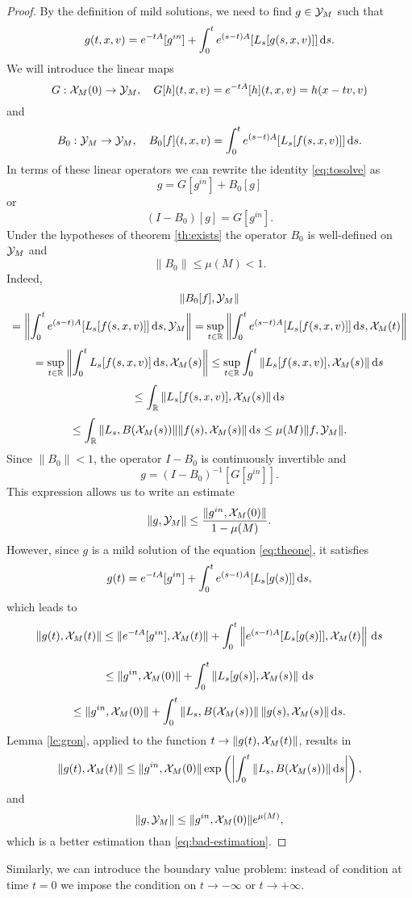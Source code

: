 \begin{proof}
	By the definition of mild solutions, we need to find $g\in {\mathcal Y_M}$ such that \begin{equation}\label{eq:tosolve}
		g(t,x,v) = e^{-tA}[g^{in}]+\int_0^te^{(s-t)A}[L_s[g(s,x,v)]]{\,\mathrm ds}.
	\end{equation}
We will introduce the linear maps \[G:{\mathcal X_M(0)}\to{\mathcal Y_M},\quad G[h](t,x,v)=e^{-tA}[h](t,x,v) = h(x-tv,v) \]and
\[B_0:{\mathcal Y_M}\to{\mathcal Y_M},\quad B_0[f](t,x,v) = \int_0^t e^{(s-t)A}[L_s[f(s,x,v)]]{\,\mathrm ds}.\]
In terms of these linear operators we can rewrite the identity \eqref{eq:tosolve} as 
\[g = G[g^{in}]+B_0[g]\] or \[(I-B_0)[g]=G[g^{in}].\]
	Under the hypotheses of   theorem \ref{th:exists} the operator $B_0$ is well-defined on ${\mathcal Y_M}$ and \[\|B_0\|\le \mu(M) <1.\]
	Indeed,
	\[\|B_0[f],{\mathcal Y_M}\|\]
	\[=\left\|\int_0^te^{(s-t)A}[L_s[f(s,x,v)]]{\,\mathrm ds} ,{\mathcal Y_M} \right\|=\sup_{t\in{\mathbb R}}\left\|\int_0^te^{(s-t)A}[L_s[f(s,x,v)]]{\,\mathrm ds},{\mathcal X_M(t)}\right\|\]
	\[=
	\sup_{t\in{\mathbb R}}\left\|\int_0^t  L_s[f(s,x,v) ]{\,\mathrm ds},{\mathcal X_M(s)}\right\|
	  \le \sup_{t\in{\mathbb R}}\int_0^t\|  L_s[f(s,x,v) ],{\mathcal X_M(s)}\|{\,\mathrm ds}\]
	\[\le \int_{{\mathbb R}}\|  L_s[f(s,x,v) ],{\mathcal X_M(s)}\|{\,\mathrm ds}\]\[\le \int_{{\mathbb R}}\|  L_s ,B({\mathcal X_M(s)})\|\|f(s),{\mathcal X_M(s)}\|{\,\mathrm ds}\le  \mu(M)\|f,{\mathcal Y_M}\|.\]
	Since $\|B_0\|<1$, the operator $I-B_0$ is continuously invertible and 
	\[g = (I-B_0)^{-1}[G[g^{in}]].\]
	This expression allows us to write an estimate
		\begin{equation}\label{eq:bad-estimation}
			\|g,{\mathcal Y_M}\|\le \frac{\|g^{in},{\mathcal X_M(0)}\|}{1-\mu(M)}.
		\end{equation}
	However, since $g$ is a mild solution of the equation \eqref{eq:theone}, it satisfies
	\[g(t)=e^{-tA}[g^{in}]+\int_0^te^{(s-t)A}[L_s[g(s)]]{\,\mathrm ds},\]
	which leads to 
	\[\|g(t),{\mathcal X_M(t)}\|\le \|e^{-tA}[g^{in}],{\mathcal X_M(t)}\|+\int_0^t\left\|e^{(s-t)A}[L_s[g(s)]],{\mathcal X_M(t)}\right\|{\,\mathrm ds}\]

	\[ \le \| g^{in},{\mathcal X_M(0)}\|+\int_0^t\left\| L_s[g(s)] ,{\mathcal X_M(s)}\right\|{\,\mathrm ds}\]\[\le \| g^{in},{\mathcal X_M(0)}\|+\int_0^t\left\| L_s,B({\mathcal X_M(s)})\right\|\|g(s) ,{\mathcal X_M(s)}\|{\,\mathrm ds}.\]
	Lemma \ref{le:gron}, applied to the function $t\to \|g(t),{\mathcal X_M(t)}\|$, results in 
	\[\|g(t),{\mathcal X_M(t)}\|\le \| g^{in},{\mathcal X_M(0)}\|\exp\left(\left|\int_{0}^{t}\| L_s ,B({\mathcal X_M(s)})\|{\,\mathrm ds}\right|\right),\]
	and
	\[\|g,{\mathcal Y_M}\|\le \| g^{in},{\mathcal X_M(0)}\| e^{\mu(M)} ,\]
	which is a better estimation than \eqref{eq:bad-estimation}.
\end{proof}
Similarly, we can introduce the boundary value problem: instead of condition at time $t=0$ we impose the condition on $t\to- \infty$ or $t\to+\infty$.


